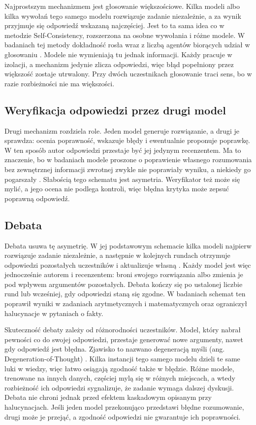Najprostszym mechanizmem jest głosowanie większościowe. Kilka modeli albo kilka wywołań tego samego modelu rozwiązuje zadanie niezależnie, a za wynik przyjmuje się odpowiedź wskazaną najczęściej. Jest to ta sama idea co w metodzie Self-Consistency, rozszerzona na osobne wywołania i różne modele. W badaniach tej metody dokładność rosła wraz z liczbą agentów biorących udział w głosowaniu \cite{more_agents_is_all_you_need}. Modele nie wymieniają tu jednak informacji. Każdy pracuje w izolacji, a mechanizm jedynie zlicza odpowiedzi, więc błąd popełniony przez większość zostaje utrwalony. Przy dwóch uczestnikach głosowanie traci sens, bo w razie rozbieżności nie ma większości.

\subsection{Weryfikacja odpowiedzi przez drugi model}

Drugi mechanizm rozdziela role. Jeden model generuje rozwiązanie, a drugi je sprawdza: ocenia poprawność, wskazuje błędy i ewentualnie proponuje poprawkę. W ten sposób autor odpowiedzi przestaje być jej jedynym recenzentem. Ma to znaczenie, bo w badaniach modele proszone o poprawienie własnego rozumowania bez zewnętrznej informacji zwrotnej zwykle nie poprawiały wyniku, a niekiedy go pogarszały \cite{llm_cannot_self_correct}. Słabością tego schematu jest asymetria. Weryfikator też może się mylić, a jego ocena nie podlega kontroli, więc błędna krytyka może zepsuć poprawną odpowiedź.

\subsection{Debata}

Debata usuwa tę asymetrię. W jej podstawowym schemacie kilka modeli najpierw rozwiązuje zadanie niezależnie, a następnie w kolejnych rundach otrzymuje odpowiedzi pozostałych uczestników i aktualizuje własną \cite{multiagent_debate}. Każdy model jest więc jednocześnie autorem i recenzentem: broni swojego rozwiązania albo zmienia je pod wpływem argumentów pozostałych. Debata kończy się po ustalonej liczbie rund lub wcześniej, gdy odpowiedzi staną się zgodne. W badaniach schemat ten poprawił wyniki w zadaniach arytmetycznych i matematycznych oraz ograniczył halucynacje w pytaniach o fakty.

Skuteczność debaty zależy od różnorodności uczestników. Model, który nabrał pewności co do swojej odpowiedzi, przestaje generować nowe argumenty, nawet gdy odpowiedź jest błędna. Zjawisko to nazwano degeneracją myśli (ang. Degeneration-of-Thought) \cite{mad_divergent_thinking}. Kilka instancji tego samego modelu dzieli te same luki w wiedzy, więc łatwo osiągają zgodność także w błędzie. Różne modele, trenowane na innych danych, częściej mylą się w różnych miejscach, a wtedy rozbieżność ich odpowiedzi sygnalizuje, że zadanie wymaga dalszej dyskusji. Debata nie chroni jednak przed efektem kaskadowym opisanym przy halucynacjach. Jeśli jeden model przekonująco przedstawi błędne rozumowanie, drugi może je przejąć, a zgodność odpowiedzi nie gwarantuje ich poprawności.
